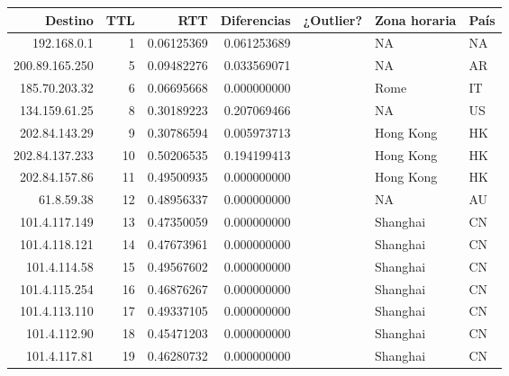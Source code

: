 \begin{center}
\begin{tabular}{rrrrlll}
Destino & TTL & RTT & Diferencias & ¿Outlier? & Zona horaria & País\\
\hline
192.168.0.1 & 1 & 0.06125369 & 0.061253689 &  & NA & NA\\
200.89.165.250 & 5 & 0.09482276 & 0.033569071 &  & NA & AR\\
185.70.203.32 & 6 & 0.06695668 & 0.000000000 &  & Rome & IT\\
134.159.61.25 & 8 & 0.30189223 & 0.207069466 &  & NA & US\\
202.84.143.29 & 9 & 0.30786594 & 0.005973713 &  & Hong Kong & HK\\
202.84.137.233 & 10 & 0.50206535 & 0.194199413 &  & Hong Kong & HK\\
202.84.157.86 & 11 & 0.49500935 & 0.000000000 &  & Hong Kong & HK\\
61.8.59.38 & 12 & 0.48956337 & 0.000000000 &  & NA & AU\\
101.4.117.149 & 13 & 0.47350059 & 0.000000000 &  & Shanghai & CN\\
101.4.118.121 & 14 & 0.47673961 & 0.000000000 &  & Shanghai & CN\\
101.4.114.58 & 15 & 0.49567602 & 0.000000000 &  & Shanghai & CN\\
101.4.115.254 & 16 & 0.46876267 & 0.000000000 &  & Shanghai & CN\\
101.4.113.110 & 17 & 0.49337105 & 0.000000000 &  & Shanghai & CN\\
101.4.112.90 & 18 & 0.45471203 & 0.000000000 &  & Shanghai & CN\\
101.4.117.81 & 19 & 0.46280732 & 0.000000000 &  & Shanghai & CN\\
\end{tabular}
\end{center}
